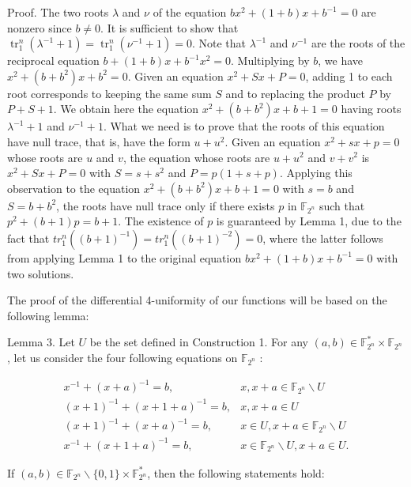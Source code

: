 \documentclass[10pt]{article}
\begin{document}
Proof. The two roots $\lambda$ and $\nu$ of the equation $b x^{2}+(1+b) x+b^{-1}=0$ are nonzero since $b \neq 0$. It is sufficient to show that $\operatorname{tr}_{1}^{n}\left(\lambda^{-1}+1\right)=\operatorname{tr}_{1}^{n}\left(\nu^{-1}+1\right)=0$. Note that $\lambda^{-1}$ and $\nu^{-1}$ are the roots of the reciprocal equation $b+(1+b) x+b^{-1} x^{2}=0$. Multiplying by $b$, we have $x^{2}+\left(b+b^{2}\right) x+b^{2}=0$. Given an equation $x^{2}+S x+P=0$, adding 1 to each root corresponds to keeping the same sum $S$ and to replacing the product $P$ by $P+S+1$. We obtain here the equation $x^{2}+\left(b+b^{2}\right) x+b+1=0$ having roots $\lambda^{-1}+1$ and $\nu^{-1}+1$. What we need is to prove that the roots of this equation have null trace, that is, have the form $u+u^{2}$. Given an equation $x^{2}+s x+p=0$ whose roots are $u$ and $v$, the equation whose roots are $u+u^{2}$ and $v+v^{2}$ is $x^{2}+S x+P=0$ with $S=s+s^{2}$ and $P=p(1+s+p)$. Applying this observation to the equation $x^{2}+\left(b+b^{2}\right) x+b+1=0$ with $s=b$ and $S=b+b^{2}$, the roots have null trace only if there exists $p$ in $\mathbb{F}_{2^{n}}$ such that $p^{2}+(b+1) p=b+1$. The existence of $p$ is guaranteed by Lemma 1, due to the fact that $t r_{1}^{n}\left((b+1)^{-1}\right)=t r_{1}^{n}\left((b+1)^{-2}\right)=0$, where the latter follows from applying Lemma 1 to the original equation $b x^{2}+(1+b) x+b^{-1}=0$ with two solutions.

The proof of the differential 4-uniformity of our functions will be based on the following lemma:

Lemma 3. Let $U$ be the set defined in Construction 1. For any $(a, b) \in \mathbb{F}_{2^{n}}^{*} \times \mathbb{F}_{2^{n}}$, let us consider the four following equations on $\mathbb{F}_{2^{n}}$ :

\[
\begin{array}{rc}
x^{-1}+(x+a)^{-1}=b, & x, x+a \in \mathbb{F}_{2^{n}} \backslash U \\
(x+1)^{-1}+(x+1+a)^{-1}=b, & x, x+a \in U \\
(x+1)^{-1}+(x+a)^{-1}=b, & x \in U, x+a \in \mathbb{F}_{2^{n}} \backslash U \\
x^{-1}+(x+1+a)^{-1}=b, & x \in \mathbb{F}_{2^{n}} \backslash U, x+a \in U . \tag{5}
\end{array}
\]

If $(a, b) \in \mathbb{F}_{2^{n}} \backslash\{0,1\} \times \mathbb{F}_{2^{n}}^{*}$, then the following statements hold:
\end{document}
